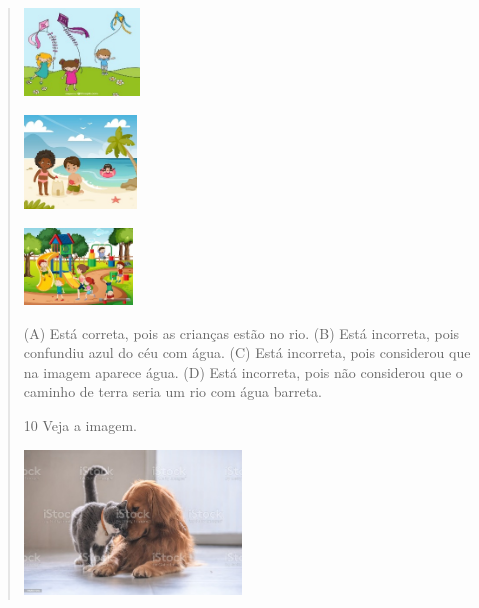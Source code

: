 \begin{verse}
\begin{escolha}
\item \includegraphics[width=1.21181in,height=0.92014in]{media/image155.jpeg}

\item \includegraphics[width=1.18125in,height=0.98472in]{media/image156.jpeg}

\item \includegraphics[width=1.13611in,height=0.80208in]{media/image157.jpeg}
\end{escolha}



(A) Está correta, pois as crianças estão no rio.
(B) Está incorreta, pois confundiu azul do céu com água.
(C) Está incorreta, pois considerou que na imagem aparece água.
(D) Está incorreta, pois não considerou que o caminho de terra seria um rio com água barreta.

\num{10} Veja a imagem.

\includegraphics[width=2.27539in,height=1.51515in]{media/image158.jpeg}


\end{verse}
